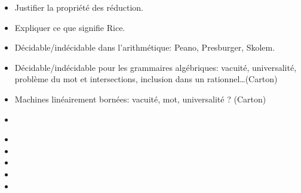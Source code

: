 \documentclass{agregfiche}
\begin{document}
\secquestionsclassiques
\begin{itemize}
\item Justifier la propriété des réduction.
\item Expliquer ce que signifie Rice.
\item Décidable/indécidable dans l'arithmétique: Peano, Presburger, Skolem.
\item Décidable/indécidable pour les grammaires algébriques: vacuité, universalité, problème du mot et intersections, inclusion dans un rationnel\dots (Carton)
\item Machines linéairement bornées: vacuité, mot, universalité ? (Carton)
\end{itemize}

\secreferences
\begin{itemize}
\item 
\end{itemize}

\secdev
\begin{itemize}
\item 
\item 
\item 
\item 
\item 

\end{itemize}
\end{document}
